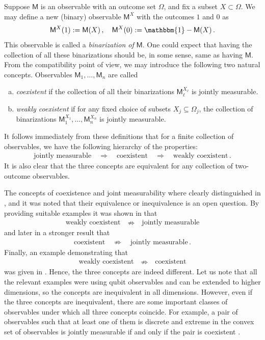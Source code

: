 \documentclass[12pt]{article}
\theoremstyle{definition}
\newcommand{\id}{\mathbbm{1}} %
\newcommand{\Mo}{\mathsf{M}}%
\begin{document}
Suppose $\Mo$ is an observable with an outcome set $\Omega$, and fix 
a subset $X\subset\Omega$. We may define a new (binary) observable 
$\Mo^X$ with the outcomes $1$ 
and $0$ as
\begin{equation}
\Mo^X(1) := \Mo(X) \, , \quad \Mo^X(0) := \id-\Mo(X) \, .
\end{equation} 
This observable is called a \emph{binarization of} $\Mo$.
One could expect that having the collection of all these binarizations 
should be, in some sense, same as having $\Mo$. From the compatibility 
point of view, we may introduce the following two natural concepts. 
Observables $\Mo_1,\ldots,\Mo_n$ are called
\begin{enumerate}[(a)]
\item \emph{coexistent} if the collection of all their binarizations $\Mo_\ell^{X_\ell}$ is jointly measurable.
\item \emph{weakly coexistent} if for any fixed choice of subsets $X_j \subseteq \Omega_j$, the collection of binarizations $\Mo_1^{X_1},\ldots,\Mo_n^{X_n}$ is jointly measurable.
\end{enumerate}
It follows immediately from these definitions that for a finite collection of observables, we have the following hierarchy of the properties:
\begin{align*}
\textrm{jointly measurable} \quad \Rightarrow \quad \textrm{coexistent} \quad \Rightarrow \quad \textrm{weakly coexistent} \, .
\end{align*}
It is also clear that the three concepts are equivalent for any collection of two-outcome observables.

The concepts of coexistence and joint measurability where clearly distinguished in \cite{LaPu97}, \cite{LaPu01} and it was noted that their equivalence or inequivalence is an open question. 
By providing suitable examples it was shown in \cite{HeReSt08} that 
\begin{align*}
\textrm{weakly coexistent}  \quad \nRightarrow \quad  \textrm{jointly measurable}
\end{align*}
and later in \cite{ReReWo13} a stronger result that
\begin{align*}
\textrm{coexistent} \quad \nRightarrow \quad \textrm{jointly measurable} \, .
\end{align*}
Finally, an example demonstrating that 
\begin{align*}
\textrm{weakly coexistent} \quad \nRightarrow \quad \textrm{coexistent}
\end{align*}
was given in \cite{HaPeUo15}.
Hence, the three concepts are indeed different. Let us note that all the relevant examples were using qubit observables and can be extended to higher dimensions, so the concepts are inequivalent in all dimensions.
However, even if the three concepts are inequivalent, there are some important classes of observables under which all three concepts coincide. For example, a pair of observables such that at least one of them is discrete and extreme in the convex set of observables is jointly measurable if and only if the pair is coexistent \cite{HaPeUo15}. 
\end{document}

